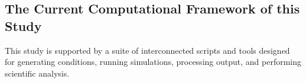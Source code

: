 \newpage
\subsection{The Current Computational Framework of this Study}
This study is supported by a suite of interconnected scripts and tools designed for generating conditions, running simulations, processing output, and performing scientific analysis.


